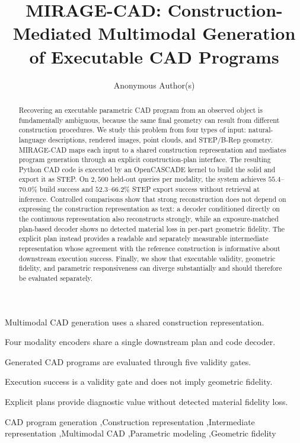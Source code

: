 \documentclass[preprint,12pt]{elsarticle}
\begin{document}
\begin{highlights}
  \item Multimodal CAD generation uses a shared construction representation.
  \item Four modality encoders share a single downstream plan and code decoder.
  \item Generated CAD programs are evaluated through five validity gates.
  \item Execution success is a validity gate and does not imply geometric fidelity.
  \item Explicit plans provide diagnostic value without detected material fidelity loss.
\end{highlights}

\begin{frontmatter}

  \title{MIRAGE-CAD: Construction-Mediated Multimodal Generation of
    Executable CAD Programs}

  \author[inst1]{Anonymous Author(s)}


  \begin{abstract}
    Recovering an executable parametric CAD program from an observed object is
    fundamentally ambiguous, because the same final geometry can result from
    different construction procedures. We study this problem from four types of
    input: natural-language descriptions, rendered images, point clouds, and
    STEP/B-Rep geometry. MIRAGE-CAD maps each input to a shared construction representation and
    mediates program generation through an explicit construction-plan interface.
    The resulting Python CAD code is executed by an OpenCASCADE kernel to build
    the solid and export it as STEP. On $2{,}500$ held-out queries per
    modality, the system achieves $55.4$--$70.0\%$ build success and
    $52.3$--$66.2\%$ STEP export success without retrieval at inference. Controlled
    comparisons show that strong reconstruction does not depend on expressing the
    construction representation as text: a decoder conditioned directly on the
    continuous representation also reconstructs strongly, while an
    exposure-matched plan-based decoder shows no detected material loss in per-part
    geometric fidelity. The explicit plan instead provides a readable and
    separately measurable intermediate representation whose agreement with the
    reference construction is informative about downstream execution success.
    Finally, we show that executable validity, geometric fidelity, and parametric
    responsiveness can diverge substantially and should therefore be evaluated
    separately.
  \end{abstract}

  \begin{keyword}
    CAD program generation
    \sep Construction representation
    \sep Intermediate representation
    \sep Multimodal CAD
    \sep Parametric modeling
    \sep Geometric fidelity
  \end{keyword}

\end{frontmatter}
\end{document}
